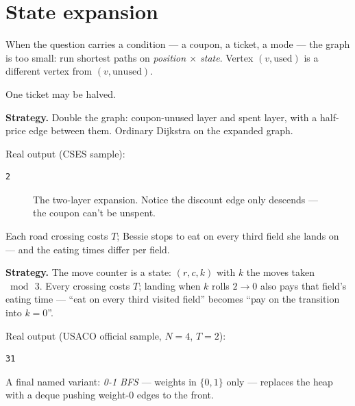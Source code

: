 \section{State expansion}\label{sec:state}
When the question carries a condition --- a coupon, a ticket, a mode
--- the graph is too small: run shortest paths on
\emph{position $\times$ state}. Vertex $(v, \text{used})$ is a
different vertex from $(v, \text{unused})$.
\begin{example}\label{ex:discount}
One ticket may be halved.
\par\smallskip
\textbf{Strategy.} Double the graph: coupon-unused layer and spent
layer, with a half-price edge between them. Ordinary Dijkstra on the
expanded graph.
\par\smallskip
\begin{solution}

Real output (CSES sample):
\begin{lstlisting}[numbers=none]
2
\end{lstlisting}
\end{solution}
\end{example}
\begin{figure}[ht]\centering

\caption{The two-layer expansion. Notice the discount edge only
descends --- the coupon can't be unspent.}
\label{fig:layers}
\end{figure}
\begin{example}\label{ex:cow}
Each road crossing costs $T$; Bessie stops to eat on every third
field she lands on --- and the eating times differ per field.
\par\smallskip
\textbf{Strategy.} The move counter is a state: $(r,c,k)$ with
$k$ the moves taken $\bmod\,3$. Every crossing costs $T$; landing
when $k$ rolls $2\to0$ also pays that field's eating time ---
``eat on every third visited field'' becomes ``pay on the
transition into $k{=}0$''.
\par\smallskip
\begin{solution}

Real output (USACO official sample, $N{=}4$, $T{=}2$):
\begin{lstlisting}[numbers=none]
31
\end{lstlisting}
\end{solution}
\end{example}
A final named variant: \emph{0-1 BFS} --- weights in
$\{0,1\}$ only --- replaces the heap with a deque pushing weight-0
edges to the front.

